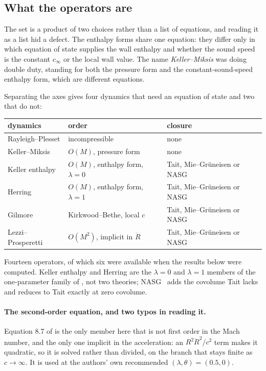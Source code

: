 \documentclass[10pt]{article}
\begin{document}
\subsection{What the operators are}
\label{sec:operators}

The set is a product of two choices rather than a list of equations, and reading it as a list
hid a defect. The enthalpy forms share one equation: they differ only in which equation of
state supplies the wall enthalpy and whether the sound speed is the constant $c_\infty$ or the
local wall value. The name \emph{Keller--Miksis} was doing double duty, standing for both the
pressure form and the constant-sound-speed enthalpy form, which are different equations.

Separating the axes gives four dynamics that need an equation of state and two that do not:

\begin{center}
\begin{tabular}{lll}
\toprule
dynamics & order & closure \\
\midrule
Rayleigh--Plesset & incompressible & none \\
Keller--Miksis & $O(M)$, pressure form & none \\
Keller enthalpy & $O(M)$, enthalpy form, $\lambda=0$ & Tait, Mie--Gr\"uneisen or NASG \\
Herring & $O(M)$, enthalpy form, $\lambda=1$ & Tait, Mie--Gr\"uneisen or NASG \\
Gilmore & Kirkwood--Bethe, local $c$ & Tait, Mie--Gr\"uneisen or NASG \\
Lezzi--Prosperetti & $O(M^2)$, implicit in $\ddot R$ & Tait, Mie--Gr\"uneisen or NASG \\
\bottomrule
\end{tabular}
\end{center}

\noindent Fourteen operators, of which six were available when the results below were
computed. Keller enthalpy and Herring are the $\lambda=0$ and $\lambda=1$ members of the
one-parameter family of \citet{prosperetti1986bubble}, not two theories; NASG~\citep{lemetayer2016noble} adds the
covolume Tait lacks and reduces to Tait exactly at zero covolume.

\paragraph{The second-order equation, and two typos in reading it.} Equation 8.7 of
\citet{lezzi1987bubble} is the only member here that is not first order in the Mach number, and
the only one implicit in the acceleration: an $R^2\ddot R^2/c^2$ term makes it quadratic, so it
is solved rather than divided, on the branch that stays finite as $c\to\infty$. It is used at
the authors' own recommended $(\lambda,\theta) = (0.5, 0)$.
\end{document}
